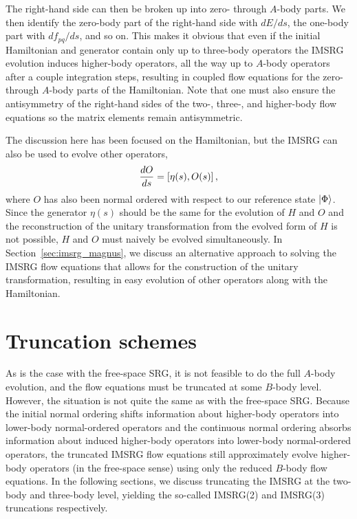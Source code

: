 The right-hand side can then be broken up into zero- through $A$-body parts.
We then identify the zero-body part of the right-hand side with $dE/ds$,
the one-body part with $df_{pq}/ds$, and so on.
This makes it obvious that
even if the initial Hamiltonian and generator contain only up to three-body operators
the IMSRG evolution induces higher-body operators,
all the way up to $A$-body operators after a couple integration steps,
resulting in coupled flow equations for the zero- through $A$-body parts
of the Hamiltonian.
Note that one must also ensure the antisymmetry of the right-hand sides of the two-,
three-, and higher-body flow equations
so the matrix elements remain antisymmetric.

The discussion here has been focused on the Hamiltonian,
but the IMSRG can also be used to evolve other operators,
\begin{equation}
  \frac{dO}{ds} = [\eta(s), O(s)]\,,
\end{equation}
where $O$ has also been normal ordered with respect to our reference state $\ket{\Phi}$.
Since the generator $\eta(s)$ should be the same for the evolution of $H$ and $O$
and the reconstruction of the unitary transformation from the evolved form of $H$
is not possible,
$H$ and $O$ must naively be evolved simultaneously.
In Section~\ref{sec:imsrg_magnus}, we discuss an alternative approach to solving the IMSRG flow equations
that allows for the construction of the unitary transformation,
resulting in easy evolution of other operators along with the Hamiltonian.

\section{Truncation schemes}

As is the case with the free-space SRG,
it is not feasible to do the full $A$-body evolution,
and the flow equations must be truncated at some $B$-body level.
However, the situation is not quite the same as with the free-space SRG.\@
Because the initial normal ordering shifts information about higher-body operators
into lower-body normal-ordered operators
and the continuous normal ordering absorbs information about induced higher-body operators
into lower-body normal-ordered operators,
the truncated IMSRG flow equations still approximately evolve higher-body operators
(in the free-space sense)
using only the reduced $B$-body flow equations.
In the following sections,
we discuss truncating the IMSRG at the two-body and three-body level,
yielding the so-called IMSRG(2) and IMSRG(3) truncations respectively.

